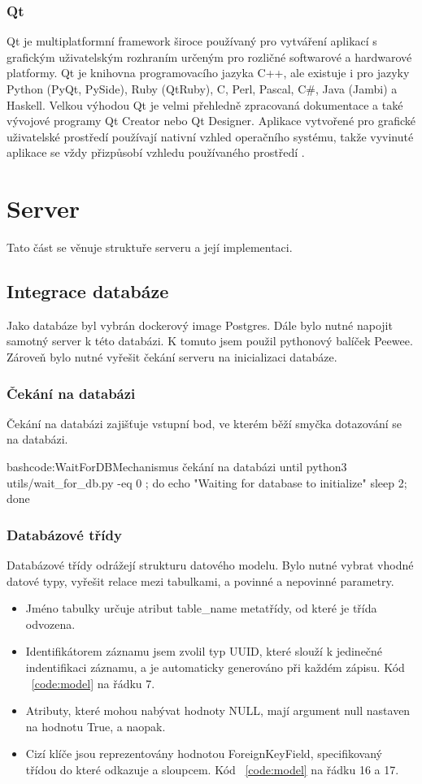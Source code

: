 \documentclass[
  glossaries,
]{kidiplom}
\begin{document}
\subsubsection{Qt}
Qt je multiplatformní framework široce používaný pro vytváření aplikací s grafickým uživatelským rozhraním určeným pro rozličné softwarové a hardwarové platformy. Qt je knihovna programovacího jazyka C++, ale existuje i pro jazyky Python (PyQt, PySide), Ruby (QtRuby), C, Perl, Pascal, C\#, Java (Jambi) a Haskell. Velkou výhodou Qt je velmi přehledně zpracovaná dokumentace a také vývojové programy Qt Creator nebo Qt Designer. Aplikace vytvořené pro grafické uživatelské prostředí používají nativní vzhled operačního systému, takže vyvinuté aplikace se vždy přizpůsobí vzhledu používaného prostředí \cite{QT}.

\clearpage
\section{Server}
Tato část se věnuje struktuře serveru a její implementaci. 
\subsection{Integrace databáze}
Jako databáze byl vybrán dockerový image Postgres. Dále bylo nutné napojit samotný server k této databázi. K tomuto jsem použil pythonový balíček Peewee. Zároveň bylo nutné vyřešit čekání serveru na inicializaci databáze.

\subsubsection{Čekání na databázi}
Čekání na databázi zajišťuje vstupní bod, ve kterém běží smyčka dotazování se na databázi.
\begin{kicode}{bash}{code:WaitForDB}{Mechanismus čekání na databázi}
until python3 utils/wait_for_db.py -eq 0 ; do
    echo "Waiting for database to initialize"
    sleep 2;
done
\end{kicode}

\subsubsection{Databázové třídy}
Databázové třídy odrážejí strukturu datového modelu. Bylo nutné vybrat vhodné datové typy, vyřešit relace mezi tabulkami, a povinné a nepovinné parametry.
\begin{itemize}
\item Jméno tabulky určuje atribut table\_name metatřídy, od které je třída odvozena.
\item Identifikátorem záznamu jsem zvolil typ UUID, které slouží k jedinečné indentifikaci záznamu, a je automaticky generováno při každém zápisu. Kód ~\ref{code:model} na řádku 7.
\item Atributy, které mohou nabývat hodnoty NULL, mají argument null nastaven na hodnotu True, a naopak.
\item Cizí klíče jsou reprezentovány hodnotou ForeignKeyField, specifikovaný třídou do které odkazuje a sloupcem. Kód ~\ref{code:model} na řádku 16 a 17.
\end{itemize}
\end{document}
